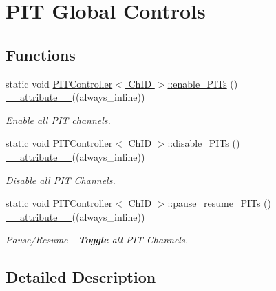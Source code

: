\hypertarget{group__PIT__Glb}{}\section{\textquotesingle{}\textquotesingle{}P\+IT Global Controls\textquotesingle{}\textquotesingle{}}
\label{group__PIT__Glb}
\subsection*{Functions}
\begin{DoxyCompactItemize}
\item 
static void \hyperlink{group__PIT__Glb_gaa742977692efbc075b52a5dbd6533230}{P\+I\+T\+Controller$<$ Ch\+I\+D $>$\+::enable\+\_\+\+P\+I\+Ts} () \hyperlink{utilities_8hpp_a103d5b3998e0dd804213c8f30a094f4d}{\+\_\+\+\_\+attribute\+\_\+\+\_\+}((always\+\_\+inline))
\begin{DoxyCompactList}\small\item\em Enable all P\+IT channels. \end{DoxyCompactList}\item 
static void \hyperlink{group__PIT__Glb_ga5e1bf9f8053a51c68f0ff2178ab56954}{P\+I\+T\+Controller$<$ Ch\+I\+D $>$\+::disable\+\_\+\+P\+I\+Ts} () \hyperlink{utilities_8hpp_a103d5b3998e0dd804213c8f30a094f4d}{\+\_\+\+\_\+attribute\+\_\+\+\_\+}((always\+\_\+inline))
\begin{DoxyCompactList}\small\item\em Disable all P\+IT Channels. \end{DoxyCompactList}\item 
static void \hyperlink{group__PIT__Glb_ga24b7ea02555967ef945ab87aae338574}{P\+I\+T\+Controller$<$ Ch\+I\+D $>$\+::pause\+\_\+resume\+\_\+\+P\+I\+Ts} () \hyperlink{utilities_8hpp_a103d5b3998e0dd804213c8f30a094f4d}{\+\_\+\+\_\+attribute\+\_\+\+\_\+}((always\+\_\+inline))
\begin{DoxyCompactList}\small\item\em Pause/\+Resume -\/ {\bfseries Toggle} all P\+IT Channels. \end{DoxyCompactList}\end{DoxyCompactItemize}


\subsection{Detailed Description}



